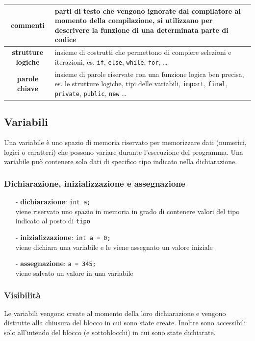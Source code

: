 \documentclass[a4paper]{article}
\begin{document}
\begin{center}
\begin{tabularx}{\textwidth}{c X}
		\textbf{commenti}
		& parti di testo che vengono ignorate dal compilatore al momento della compilazione, si utilizzano per descrivere
		la funzione di una determinata parte di codice \\
		\midrule

		\textbf{strutture logiche}
		& insieme di costrutti che permettono di compiere selezioni e iterazioni, es. \verb|if|, \verb|else|, \verb|while|,
		\verb|for|, \dots \\
		\midrule

		\textbf{parole chiave}
		& insieme di parole riservate con una funzione logica ben precisa, es. le strutture logiche, tipi delle variabili,
		\verb|import|, \verb|final|, \verb|private|, \verb|public|, \verb|new| \dots
	\end{tabularx}
\end{center}


\subsection{Variabili}
Una variabile è uno spazio di memoria riservato per memorizzare dati (numerici, logici o caratteri) che possono variare
durante l'esecuzione del programma. Una variabile può contenere solo dati di specifico tipo indicato nella dichiarazione.

\subsubsection*{Dichiarazione, inizializzazione e assegnazione}
\begin{itemize}[topsep=3pt, itemsep=0pt]
	\item[-] \textbf{dichiarazione}: \verb|int a;| \\
	viene riservato uno spazio in memoria in grado di contenere valori del tipo indicato al posto di \verb|tipo|
	\item[-] \textbf{inizializzazione}: \verb|int a = 0;| \\
	viene dichiara una variabile e le viene assegnato un valore iniziale
	\item[-] \textbf{assegnazione}: \verb|a = 345;| \\
	viene salvato un valore in una variabile
\end{itemize}

\subsubsection*{Visibilità}
Le variabili vengono create al momento della loro dichiarazione e vengono distrutte alla chiusura del blocco in cui sono
state create. Inoltre sono accessibili solo all'intendo del blocco (e sottoblocchi) in cui sono state dichiarate.
\end{document}
